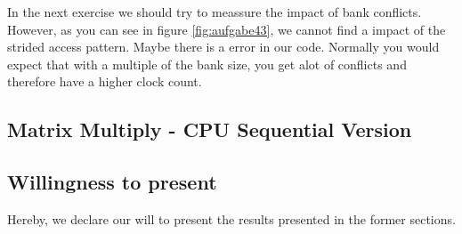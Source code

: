 \documentclass[12pt]{article}
\begin{document}
In the next exercise we should try to meassure the impact of bank conflicts. However, as you can see in figure \ref{fig:aufgabe43}, we cannot find a impact of the strided access pattern. Maybe there is a error in our code. Normally you would expect that with a multiple of the bank size, you get alot of conflicts and therefore have a higher clock count.


\subsection{Matrix Multiply - CPU Sequential Version}

\subsection{Willingness to present}
Hereby, we declare our will to present the results presented in the former sections.
\end{document}
